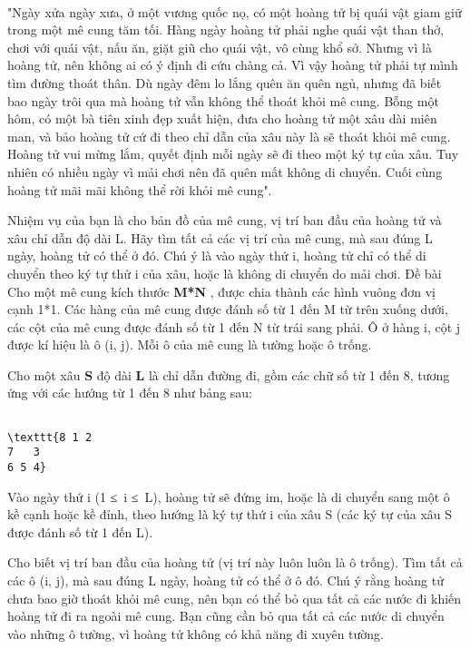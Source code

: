  

"Ngày xửa ngày xưa, ở một vương quốc nọ, có một hoàng tử bị quái vật giam giữ trong một mê cung tăm tối. Hàng ngày hoàng tử phải nghe quái vật than thở, chơi với quái vật, nấu ăn, giặt giũ cho quái vật, vô cùng khổ sở. Nhưng vì là hoàng tử, nên không ai có ý định đi cứu chàng cả. Vì vậy hoàng tử phải tự mình tìm đường thoát thân. Dù ngày đêm lo lắng quên ăn quên ngủ, nhưng đã biết bao ngày trôi qua mà hoàng tử vẫn không thể thoát khỏi mê cung. Bỗng một hôm, có một bà tiên xinh đẹp xuất hiện, đưa cho hoàng tử một xâu dài miên man, và bảo hoàng tử cứ đi theo chỉ dẫn của xâu này là sẽ thoát khỏi mê cung. Hoàng tử vui mừng lắm, quyết định mỗi ngày sẽ đi theo một ký tự của xâu. Tuy nhiên có nhiều ngày vì mải chơi nên đã quên mất không di chuyển. Cuối cùng hoàng tử mãi mãi không thể rời khỏi mê cung".

Nhiệm vụ của bạn là cho bản đồ của mê cung, vị trí ban đầu của hoàng tử và xâu chỉ dẫn độ dài L. Hãy tìm tất cả các vị trí của mê cung, mà sau đúng L ngày, hoàng tử có thể ở đó. Chú ý là vào ngày thứ i, hoàng tử chỉ có thể di chuyển theo ký tự thứ i của xâu, hoặc là không di chuyển do mải chơi.
Đề bài
Cho một mê cung kích thước \textbf{ M*N } , được chia thành các hình vuông đơn vị cạnh 1*1. Các hàng của mê cung được đánh số từ 1 đến M từ trên xuống dưới, các cột của mê cung được đánh số từ 1 đến N từ trái sang phải. Ô ở hàng i, cột j được kí hiệu là ô (i, j). Mỗi ô của mê cung là tường hoặc ô trống.

Cho một xâu \textbf{ S } độ dài \textbf{ L } là chỉ dẫn đường đi, gồm các chữ số từ 1 đến 8, tương ứng với các hướng từ 1 đến 8 như bảng sau:
\begin{verbatim}

\texttt{8 1 2
7   3
6 5 4}\end{verbatim}

Vào ngày thứ i (1 ≤ i ≤ L), hoàng tử sẽ đứng im, hoặc là di chuyển sang một ô kề cạnh hoặc kề đỉnh, theo hướng là ký tự thứ i của xâu S (các ký tự của xâu S được đánh số từ 1 đến L).

Cho biết vị trí ban đầu của hoàng tử (vị trí này luôn luôn là ô trống). Tìm tất cả các ô (i, j), mà sau đúng L ngày, hoàng tử có thể ở ô đó. Chú ý rằng hoàng tử chưa bao giờ thoát khỏi mê cung, nên bạn có thể bỏ qua tất cả các nước đi khiến hoàng tử đi ra ngoài mê cung. Bạn cũng cần bỏ qua tất cả các nước di chuyển vào những ô tường, vì hoàng tử không có khả năng đi xuyên tường.